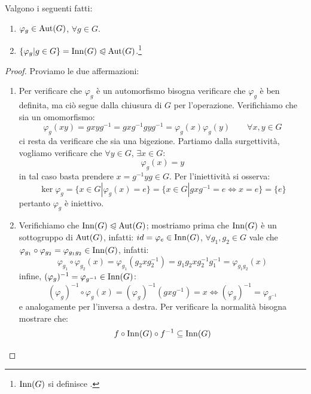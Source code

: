 \documentclass[11pt]{scrartcl}
\begin{document}
\begin{proposition}
    \label{prop1}
    Valgono i seguenti fatti:
    \begin{enumerate}[(1)]
        \item $\varphi_g \in \operatorname{Aut}(G)$, $\forall g \in G$.
        \item $\{\varphi_g | g \in G\} = \operatorname{Inn}(G) \trianglelefteqslant \operatorname{Aut}(G)$.\footnote{$\operatorname{Inn}(G)$ si definisce .}
    \end{enumerate}
\end{proposition}

\begin{proof}
    Proviamo le due affermazioni:
        \begin{enumerate}[(1)]
            \item Per verificare che $\varphi_g$ è un automorfismo bisogna verificare che $\varphi_g$ è ben definita, ma ciò segue dalla chiusura di $G$ per l'operazione.
                Verifichiamo che sia un omomorfismo:
                    \[ \varphi_g(xy) = g x y g^{-1} = gxg^{-1}gyg^{-1} = \varphi_g(x)\varphi_g(y)
                    \qquad \forall x,y \in G 
                        \]
                ci resta da verificare che sia una bigezione. Partiamo dalla surgettività, vogliamo verificare che $\forall y \in G$, $\exists x \in G :$
                    \[ \varphi_g(x) = y
                        \]
                in tal caso basta prendere $x = g^{-1}yg \in G$. Per l'iniettività si osserva:
                    \[ \ker \varphi_g = \{x \in G | \varphi_g(x) = e\} = \{x \in G | gxg^{-1} = e \iff x = e\} = \{e\}
                        \]
                pertanto $\varphi_g$ è iniettivo.
            \item Verifichiamo che $\operatorname{Inn}(G) \trianglelefteqslant \operatorname{Aut}(G)$; mostriamo prima che $\operatorname{Inn}(G)$ è un sottogruppo di $\operatorname{Aut}(G)$, infatti: 
            $id = \varphi_e \in \operatorname{Inn}(G)$, $\forall g_1,g_2 \in G$ vale che $\varphi_{g_{1}} \circ \varphi_{g_{2}} = \varphi_{g_1g_2} \in \operatorname{Inn}(G)$, infatti:
                    \[ \varphi_{g_{1}} \circ \varphi_{g_{2}}(x) = \varphi_{g_{1}}(g_2xg_2^{-1}) = g_1g_2xg_2^{-1}g_1^{-1} = \varphi_{g_1g_2}(x)
                        \]
                infine, $(\varphi_{g})^{-1} = \varphi_{g^{-1}} \in \operatorname{Inn}(G)$:
                    \[ (\varphi_{g})^{-1} \circ \varphi_{g}(x) = (\varphi_{g})^{-1} (gxg^{-1}) = x \iff (\varphi_{g})^{-1} = \varphi_{g^{-1}}
                        \]
                e analogamente per l'inversa a destra. Per verificare la normalità bisogna mostrare che:
                    \[ f \circ \operatorname{Inn}(G) \circ f^{-1} \subseteq \operatorname{Inn}(G)
\]
\end{enumerate}
\end{proof}
\end{document}
